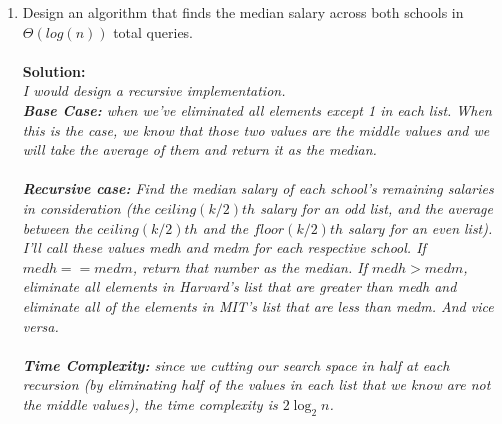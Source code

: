 \documentclass[10pt]{article}
\begin{document}
\begin{enumerate}
    \item Design an algorithm that finds the median salary across both schools in $\Theta(log(n))$ total queries. \\ \\
    \textbf{Solution:} \\ \emph{
        I would design a recursive implementation. \\
        \textbf{Base Case:} when we've eliminated all elements except 1 in each list. When this is the case, we know that those two values are the middle values and we will take the average of them and return it as the median. \\ \\
        \textbf{Recursive case:} Find the median salary of each school's remaining salaries in consideration (the $ceiling(k/2)th$ salary for an odd list, and the average between the $ceiling(k/2)th$ and the $floor(k/2)th$ salary for an even list). I'll call these values medh and medm for each respective school. If $medh == medm$, return that number as the median. If $medh > medm$, eliminate all elements in Harvard's list that are greater than medh and eliminate all of the elements in MIT's list that are less than medm. And vice versa. \\ \\
        \textbf{Time Complexity:} since we cutting our search space in half at each recursion (by eliminating half of the values in each list that we know are not the middle values), the time complexity is $2\log_2{n}$.
    }
    
    \pagebreak
    

\end{enumerate}
\end{document}
